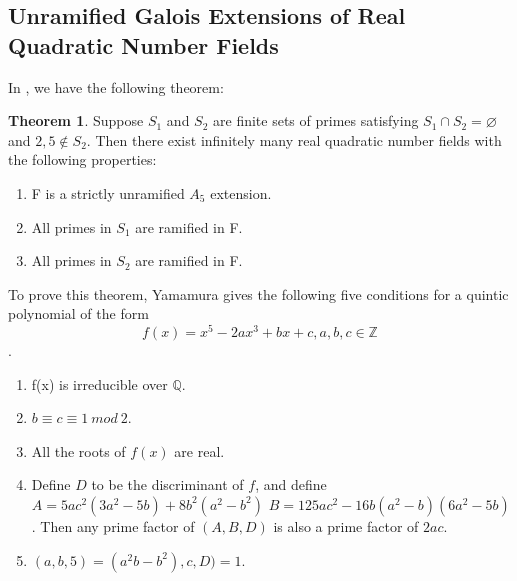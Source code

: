 \documentclass[12pt]{extarticle}
\newcommand{\Q}{\mathbb{Q}}
\newcommand{\<}{\langle}
\renewcommand{\>}{\rangle}
\renewcommand{\emptyset}{\varnothing}
\theoremstyle{definition}
\newtheorem{theorem}{Theorem}
\begin{document}
\subsection{Unramified Galois Extensions of Real Quadratic Number Fields}
In \cite{YAMAMURA2}, we have the following theorem:
\begin{theorem}
    Suppose $S_1$ and $S_2$ are finite sets of primes satisfying $S_1 \cap S_2 = \emptyset$ and $2,5 \notin S_2$. Then there exist infinitely many real quadratic number fields with the following properties: \begin{enumerate}
        \item F is a strictly unramified $A_5$ extension.
        \item All primes in $S_1$ are ramified in F.
        \item All primes in $S_2$ are ramified in F.
    \end{enumerate}
\end{theorem}
To prove this theorem, Yamamura gives the following five conditions for a quintic polynomial of the form \begin{equation}
    f(x)=x^5-2ax^3+bx+c, a,b,c \in \mathbb{Z}
\end{equation}.
\begin{enumerate}
\item f(x) is irreducible over $\Q$.
\item $b \equiv c \equiv 1 \: mod \: 2  $.
\item All the roots of $f(x)$ are real.
\item Define $D$ to be the discriminant of $f$, and define
$A= 5ac^2(3a^2-5b)+8b^2(a^2-b^2)$
$B = 125ac^2-16b(a^2-b)(6a^2-5b)$.
Then any prime factor of $(A,B,D)$ is also a prime factor of $2ac$. 

\item $(a,b,5) =(a^2b-b^2),c,D)=1$.

\end{enumerate} 
\end{document}
